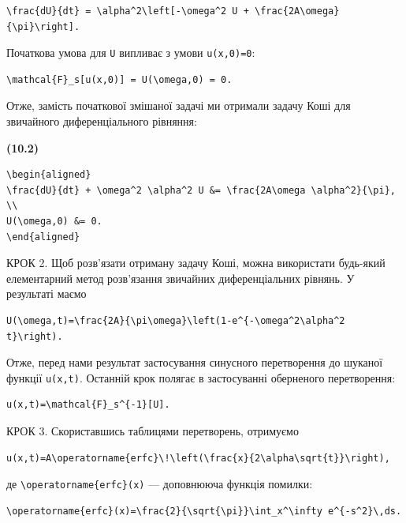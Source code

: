 \documentclass[
  ukrainian,
]{article}
\begin{document}
\begin{verbatim}
\frac{dU}{dt} = \alpha^2\left[-\omega^2 U + \frac{2A\omega}{\pi}\right].
\end{verbatim}

Початкова умова для \texttt{U} випливає з умови \texttt{u(x,0)=0}:

\begin{verbatim}
\mathcal{F}_s[u(x,0)] = U(\omega,0) = 0.
\end{verbatim}

Отже, замість початкової змішаної задачі ми отримали задачу Коші для
звичайного диференціального рівняння:

\textbf{(10.2)}

\begin{verbatim}
\begin{aligned}
\frac{dU}{dt} + \omega^2 \alpha^2 U &= \frac{2A\omega \alpha^2}{\pi}, \\
U(\omega,0) &= 0.
\end{aligned}
\end{verbatim}

КРОК 2. Щоб розв'язати отриману задачу Коші, можна використати будь-який
елементарний метод розв'язання звичайних диференціальних рівнянь. У
результаті маємо

\begin{verbatim}
U(\omega,t)=\frac{2A}{\pi\omega}\left(1-e^{-\omega^2\alpha^2 t}\right).
\end{verbatim}

Отже, перед нами результат застосування синусного перетворення до
шуканої функції \texttt{u(x,t)}. Останній крок полягає в застосуванні
оберненого перетворення:

\begin{verbatim}
u(x,t)=\mathcal{F}_s^{-1}[U].
\end{verbatim}

КРОК 3. Скориставшись таблицями перетворень, отримуємо

\begin{verbatim}
u(x,t)=A\operatorname{erfc}\!\left(\frac{x}{2\alpha\sqrt{t}}\right),
\end{verbatim}

де \texttt{\textbackslash{}operatorname\{erfc\}(x)} --- доповнююча
функція помилки:

\begin{verbatim}
\operatorname{erfc}(x)=\frac{2}{\sqrt{\pi}}\int_x^\infty e^{-s^2}\,ds.
\end{verbatim}
\end{document}
